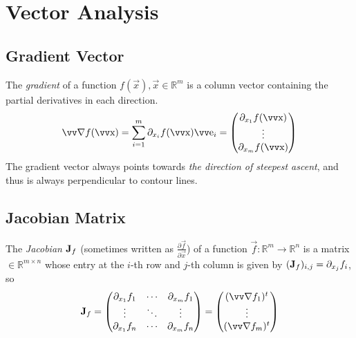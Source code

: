 
\section{Vector Analysis}

\subsection{Gradient Vector}

The \emph{gradient} of a function \(f(\vec{x}), \vec{x}\in\mathbb{R}^m\) is a column vector containing the partial derivatives in each direction.
\[
\grad f (\vec{x}) = \sum_{i=1}^m \partial_{x_i} f(\vec{x}) \vec{e}_i
	= \begin{pmatrix}
		\partial_{x_1} f(\vec{x}) \\
		\vdots \\
		\partial_{x_m} f(\vec{x}) \\
	\end{pmatrix}
\]
The gradient vector always points towards \emph{the direction of steepest ascent}, and thus is always perpendicular to contour lines.

\subsection{Jacobian Matrix}

The \emph{Jacobian} \(\bm{\mathrm{J}}_f\) (sometimes written as \(\frac{\partial \vec{f}}{\partial \vec{x}}\)) of a function \(\vec{f}: \mathbb{R}^m \to \mathbb{R}^n\) is a matrix \(\in\mathbb{R}^{m\times n}\) whose entry at the \(i\)-th row and \(j\)-th column is given by \((\bm{\mathrm{J}}_f)_{i,j} = \partial_{x_j} f_i\), so
\[
	\mx{J}_f = \begin{pmatrix}
			\partial_{x_1} f_1 & \cdots & \partial_{x_m} f_1 \\
			\vdots & \ddots & \vdots \\
			\partial_{x_1} f_n & \cdots & \partial_{x_m} f_n \\
		\end{pmatrix}
	= \begin{pmatrix}
			(\grad f_1)^t \\
			\vdots \\
			(\grad f_m)^t \\
		\end{pmatrix}
\]

